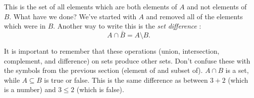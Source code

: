 \documentclass[10pt,]{book}
\theoremstyle{plain}
\theoremstyle{definition}
\theoremstyle{definition}
\theoremstyle{definition}
\begin{document}
      This is the set of all elements which are both elements of \(A\) and not elements of \(B\). What have we done? We've started with \(A\) and removed all of the elements which were in \(B\). Another way to write this is the \emph{set difference}
      :
      \begin{equation*}
        A \cap \bar B = A \setminus B.
      \end{equation*}
\par

      It is important to remember that these operations (union, intersection, complement, and difference) on sets produce other sets. Don't confuse these with the symbols from the previous section (element of and subset of). \(A \cap B\) is a set,
      while \(A \subseteq B\) is true or false. This is the same difference as between \(3 + 2\) (which is a number) and \(3 \le 2\) (which is false).
\end{document}
